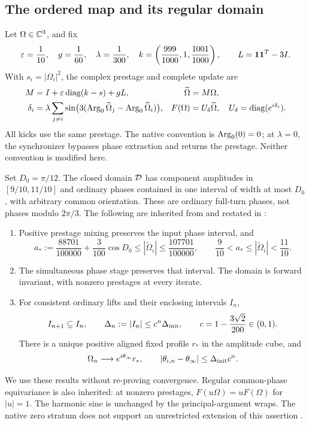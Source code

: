\subsection{The ordered map and its regular domain}
Let \(\Omega\in\mathbb C^3\), and fix
\begin{equation}
\varepsilon=\frac1{10},\quad g=\frac1{60},\quad\lambda=\frac1{300},\quad
k=\left(\frac{999}{1000},1,\frac{1001}{1000}\right),\qquad
L=\mathbf1\mathbf1^T-3I.
\label{eq:parameters}
\end{equation}
With \(s_i=|\Omega_i|^2\), the complex prestage and complete update are
\begin{align}
M&=I+\varepsilon\operatorname{diag}(k-s)+gL,&\widetilde\Omega&=M\Omega,\label{eq:nativepre}\\
\delta_i&=\lambda\sum_{j\ne i}\sin\bigl(3(\operatorname{Arg}_0\widetilde\Omega_j-
\operatorname{Arg}_0\widetilde\Omega_i)\bigr),&F(\Omega)&=U_\delta\widetilde\Omega,
\quad U_\delta=\operatorname{diag}(e^{i\delta_i}).\label{eq:nativefull}
\end{align}
All kicks use the same prestage. The native convention is \(\operatorname{Arg}_0(0)=0\); at \(\lambda=0\), the synchronizer bypasses phase extraction and returns the prestage. Neither convention is modified here.

Set \(D_0=\pi/12\). The closed domain \(\mathcal D\) has component amplitudes in \([9/10,11/10]\) and ordinary phases contained in one interval of width at most \(D_0\), with arbitrary common orientation. These are ordinary full-turn phases, not phases modulo \(2\pi/3\). The following are inherited from \cite[Sections 6--7]{relaxation} and restated in \cite[Section 4]{potential}:
\begin{enumerate}
\item Positive prestage mixing preserves the input phase interval, and
\begin{equation}
a_*:=\frac{88701}{100000}+\frac3{100}\cos D_0
\le|\widetilde\Omega_i|\le\frac{107701}{100000},\qquad
\frac9{10}<a_*\le|\widetilde\Omega_i|<\frac{11}{10}.
\label{eq:prebounds}
\end{equation}
\item The simultaneous phase stage preserves that interval. The domain is forward invariant, with nonzero prestages at every iterate.
\item For consistent ordinary lifts and their enclosing intervals \(I_n\),
\begin{equation}
I_{n+1}\subseteq I_n,\qquad
\Delta_n:=|I_n|\le c^n\Delta_{\rm init},\qquad
c=1-\frac{3\sqrt2}{200}\in(0,1).
\label{eq:inheritednesting}
\end{equation}
There is a unique positive aligned fixed profile \(r_*\) in the amplitude cube, and
\begin{equation}
\Omega_n\longrightarrow e^{i\theta_\infty}r_* ,\qquad
|\theta_{i,n}-\theta_\infty|\le\Delta_{\rm init}c^n.
\label{eq:inheritedlimit}
\end{equation}
\end{enumerate}
We use these results without re-proving convergence. Regular common-phase equivariance is also inherited: at nonzero prestages, \(F(u\Omega)=uF(\Omega)\) for \(|u|=1\). The harmonic sine is unchanged by the principal-argument wraps. The native zero stratum does not support an unrestricted extension of this assertion \cite{nrg}.

